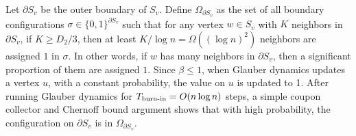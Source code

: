 \documentclass[11pt]{amsart}
\theoremstyle{definition}
\theoremstyle{remark}
\begin{document}
Let $\partial S_v$ be the outer boundary of $S_v$.
Define $\Omega_{\partial S_v}$ as the set of all boundary configurations $\sigma \in \{0,1\}^{\partial S_v}$ such that for any vertex $w \in S_v$ with $K$ neighbors in $\partial S_v$, if $K \geq D_2/3$, then at least $K/\log n = \Omega((\log n)^2)$ neighbors are assigned $1$ in $\sigma$. In other words, if $w$ has many neighbors in $\partial S_v$, then a significant proportion of them are assigned $1$. Since $\beta \leq 1$, when Glauber dynamics updates a vertex $u$, with a constant probability, the value on $u$ is updated to 1. After running Glauber dynamics for $T_{\textnormal{burn-in}} = O(n \log n)$ steps, a simple coupon collector and Chernoff bound argument shows that with high probability, the configuration on $\partial S_v$ is in $\Omega_{\partial S_v}$.
\end{document}

